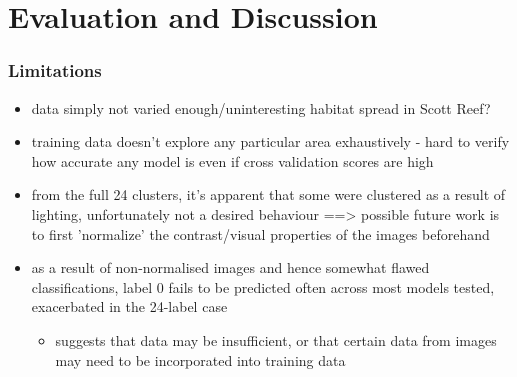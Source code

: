 \chapter{Evaluation and Discussion} \label{chap:evaluation}

\subsection{Limitations}

\begin{itemize}
    \item data simply not varied enough/uninteresting habitat spread in Scott Reef?
    \item training data doesn't explore any particular area exhaustively - hard to verify how accurate any model is even if cross validation scores are high
    \item from the full 24 clusters, it's apparent that some were clustered as a result of lighting, unfortunately not a desired behaviour ==> possible future work is to first 'normalize' the contrast/visual properties of the images beforehand 
    \item as a result of non-normalised images and hence somewhat flawed classifications, label 0 fails to be predicted often across most models tested, exacerbated in the 24-label case
        \begin{itemize}
            \item suggests that data may be insufficient, or that certain data from images may need to be incorporated into training data
        \end{itemize}
\end{itemize}
